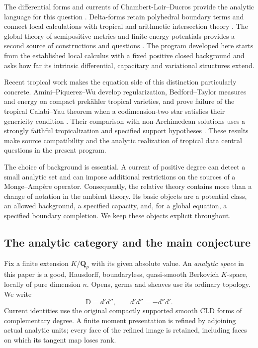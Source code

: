 \documentclass[11pt,a4paper]{article}
\theoremstyle{definition}
\theoremstyle{remark}
\numberwithin{equation}{section}
\newcommand{\Q}{\mathbf Q}
\newcommand{\D}{\mathrm D}
\begin{document}
The differential forms and currents of Chambert-Loir--Ducros provide the
analytic language for this question \cite{CLD12,CLD25}.  Delta-forms retain
polyhedral boundary terms and connect local calculations with tropical
and arithmetic intersection theory \cite{GK,Mihatsch}.  The global
theory of semipositive metrics and finite-energy potentials provides a
second source of constructions and questions
\cite{BFJmetrics,BFJma,Reboulet}.  The program developed here starts from
the established local calculus with a fixed positive closed background
and asks how far its intrinsic differential, capacitary and variational
structures extend.

Recent tropical work makes the equation side of this distinction
particularly concrete.  Amini--Piquerez--Wu develop regularization,
Bedford--Taylor measures and energy on compact prek\"ahler tropical
varieties, and prove failure of the tropical Calabi--Yau theorem when
a codimension-two star satisfies their genericity condition
\cite[Theorems~5.13 and~11.4]{APW}.  Their comparison with
non-Archimedean solutions uses a strongly faithful tropicalization
and specified support hypotheses \cite[Theorem~12.11]{APW}.  These
results make source compatibility and the analytic realization of
tropical data central questions in the present program.

The choice of background is essential.  A current of positive degree
can detect a small analytic set and can impose additional restrictions
on the sources of a Monge--Amp\`ere operator.  Consequently, the relative
theory contains more than a change of notation in the ambient theory.
Its basic objects are a potential class, an allowed background, a
specified capacity, and, for a global equation, a specified boundary
completion.  We keep these objects explicit throughout.

\subsection{The analytic category and the main conjecture}

Fix a finite extension $K/\Q_p$ with its given absolute value.  An
\emph{analytic space} in this paper is a good, Hausdorff, boundaryless,
quasi-smooth Berkovich $K$-space, locally of pure dimension $n$.  Opens,
germs and sheaves use its ordinary topology.  We write
\[
                         \D=d'd'',\qquad d'd''=-d''d'.
\]
Current identities use the original compactly supported smooth CLD
forms of complementary degree.  A finite moment presentation is refined
by adjoining actual analytic units; every face of the refined image is
retained, including faces on which its tangent map loses rank.
\end{document}
